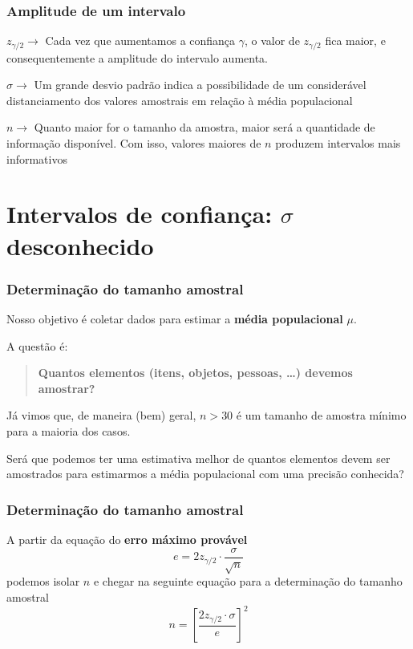 \documentclass[11pt]{beamer}
\begin{document}
\begin{frame}
\frametitle{Amplitude de um intervalo}

\(z_{\gamma/2} \rightarrow\) Cada vez que aumentamos a confiança
\(\gamma\), o valor de \(z_{\gamma/2}\) fica maior, e consequentemente a
amplitude do intervalo aumenta.

\(\sigma \rightarrow\) Um grande desvio padrão indica a possibilidade de
um considerável distanciamento dos valores amostrais em relação à média
populacional

\(n \rightarrow\) Quanto maior for o tamanho da amostra, maior será a
quantidade de informação disponível. Com isso, valores maiores de \(n\)
produzem intervalos mais informativos
\end{frame}


\section{Intervalos de confiança: \(\sigma\) desconhecido}
\begin{frame}
\frametitle{Determinação do tamanho amostral}

Nosso objetivo é coletar dados para estimar a \textbf{média
populacional} \(\mu\).

A questão é:

\begin{quote}
\textbf{Quantos elementos (itens, objetos, pessoas, \ldots{}) devemos
amostrar?}
\end{quote}

Já vimos que, de maneira (bem) geral, \(n>30\) é um tamanho de amostra
mínimo para a maioria dos casos.

Será que podemos ter uma estimativa melhor de quantos elementos devem
ser amostrados para estimarmos a média populacional com uma precisão
conhecida?
\end{frame}

\begin{frame}
\frametitle{Determinação do tamanho amostral}

A partir da equação do \textbf{erro máximo provável} \[
e = 2 z_{\gamma/2} \cdot \frac{\sigma}{\sqrt{n}}
\] podemos isolar \(n\) e chegar na seguinte equação para a determinação
do tamanho amostral \[
n = \left[ \frac{2 z_{\gamma/2} \cdot \sigma}{e} \right]^2
\]
\end{frame}
\end{document}
